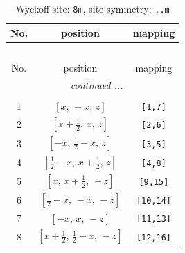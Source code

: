 \documentclass[fleqn,8pt]{jsarticle}
\begin{document}
\begin{longtable}{ccc}
\caption{Wyckoff site: {\tt 8m}, site symmetry: {\tt ..m}}
 \\
 \hline \hline
No. & position & mapping \\ \hline \endfirsthead

\multicolumn{2}{l}{\tablename\ \thetable{}} \\
 \hline \hline
No. & position & mapping \\ \hline \endhead

 \hline \hline
\multicolumn{2}{r}{\footnotesize\it continued ...} \\ \endfoot

 \hline \hline
\multicolumn{2}{r}{} \\ \endlastfoot

1 & $\left[ x,\, - x,\, z \right]$ & {\tt [1,7]} \\ \hline
2 & $\left[ x + \frac{1}{2},\, x,\, z \right]$ & {\tt [2,6]} \\ \hline
3 & $\left[ - x,\, \frac{1}{2} - x,\, z \right]$ & {\tt [3,5]} \\ \hline
4 & $\left[ \frac{1}{2} - x,\, x + \frac{1}{2},\, z \right]$ & {\tt [4,8]} \\ \hline
5 & $\left[ x,\, x + \frac{1}{2},\, - z \right]$ & {\tt [9,15]} \\ \hline
6 & $\left[ \frac{1}{2} - x,\, - x,\, - z \right]$ & {\tt [10,14]} \\ \hline
7 & $\left[ - x,\, x,\, - z \right]$ & {\tt [11,13]} \\ \hline
8 & $\left[ x + \frac{1}{2},\, \frac{1}{2} - x,\, - z \right]$ & {\tt [12,16]} \\
\end{longtable}
\renewcommand{\arraystretch}{1.2}
\end{document}

